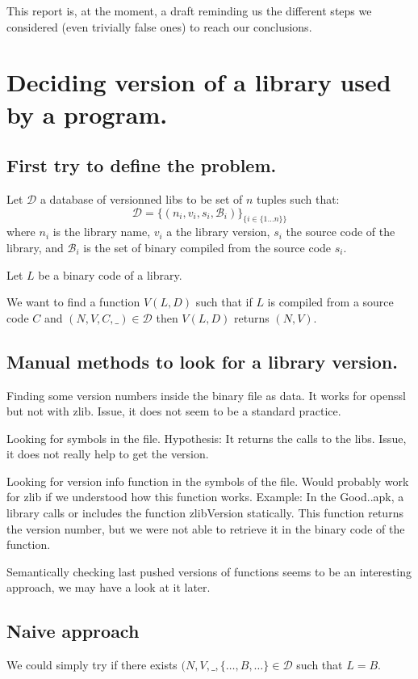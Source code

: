 \documentclass{article}
\begin{document}
    This report is, at the moment, a draft reminding us the different steps we
    considered (even trivially false ones) to reach our conclusions.

   \section{Deciding version of a library used by a program.} 

   \subsection{First try to define the problem.}

   Let $\mathcal{D}$ a database of versionned libs to be set of $n$ tuples such that:
    \[ \mathcal{D} = \{ (n_i, v_i, s_i, \mathcal{B}_i) \}_{\{i \in \{1 \dots n\}\}}  \]
    where $n_i$ is the library name, $v_i$ a the library version, $s_i$ the source
    code of the library, and $\mathcal{B}_i$ is the set of binary compiled
    from the source code $s_i$. 

    Let $L$ be a binary code of a library.

    We want to find a function $V(L,D)$ such that if $L$ is compiled from a
    source code $C$ and $(N, V, C, \_) \in \mathcal{D}$ then $V(L,D)$ returns
    $(N,V)$.

    \subsection{Manual methods to look for a library version.}
    Finding some version numbers inside the binary file as data.
    It works for openssl but not with zlib.
    Issue, it does not seem to be a standard practice.

    Looking for symbols in the file. 
    Hypothesis: It returns the calls to the libs.
    Issue, it does not really help to get the version.

    Looking for version info function in the symbols of the file. Would
    probably work for zlib if we understood how this function works.
    Example: In the Good..apk, a library calls or includes the function zlibVersion statically. This function returns the version number, but we were not able to retrieve it in the binary code of the function.
    
    Semantically checking last pushed versions of functions seems to be an
    interesting approach, we may have a look at it later.

    \subsection{Naive approach}
    We could simply try if there exists $(N, V, \_, \{\dots, B, \dots\} \in
    \mathcal{D}$ such that $L = B$.
\end{document}
